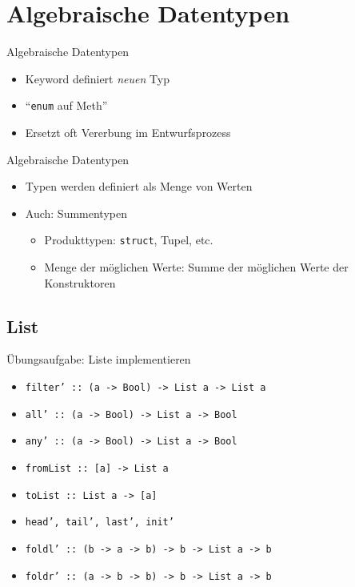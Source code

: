 \documentclass{beamer}
\newcommand{\code}[1]{
	\begin{mdframed}
		
	\end{mdframed}
}
\begin{document}
\section{Algebraische Datentypen}

\begin{frame}{Algebraische Datentypen}
	\code{demos/DataExamples.hs}

	\begin{itemize}
		\item Keyword  definiert \emph{neuen} Typ
		\item \enquote{\texttt{enum} auf Meth}
		\item Ersetzt oft Vererbung im Entwurfsprozess
	\end{itemize}
\end{frame}

\begin{frame}{Algebraische Datentypen}
	\code{demos/DataExamples2.hs}
	
	\begin{itemize}
		\item Typen werden definiert als Menge von Werten
		\item Auch: Summentypen
		\begin{itemize}
			\item Produkttypen: \texttt{struct}, Tupel, etc.
			\item Menge der möglichen Werte: Summe der möglichen Werte der Konstruktoren
		\end{itemize}
	\end{itemize}
\end{frame}

\subsection{List}

\begin{frame}{Übungsaufgabe: Liste implementieren}
	\code{demos/List.hs}

	\begin{itemize}
		\item \texttt{filter' :: (a -> Bool) -> List a -> List a}
		\item \texttt{all' :: (a -> Bool) -> List a -> Bool}
		\item \texttt{any' :: (a -> Bool) -> List a -> Bool}
		\pause
		\item \texttt{fromList :: [a] -> List a}
		\item \texttt{toList :: List a -> [a]}
		\item \texttt{head', tail', last', init'}
		\pause
		\item \texttt{foldl' :: (b -> a -> b) -> b -> List a -> b}
		\item \texttt{foldr' :: (a -> b -> b) -> b -> List a -> b}
	\end{itemize}
\end{frame}
\end{document}
